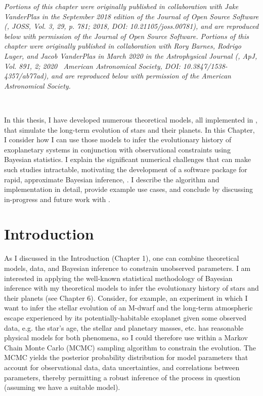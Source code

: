 \textit{Portions of this chapter were originally published in collaboration with Jake VanderPlas in the September 2018 edition of the Journal of Open Source Software (\citet{FlemingVanderPlas2018}, JOSS, Vol. 3, 29, p. 781; 2018, DOI: 10.21105/joss.00781), and are reproduced below with permission of the Journal of Open Source Software. Portions of this chapter were originally published in collaboration with Rory Barnes, Rodrigo Luger, and Jacob VanderPlas in March 2020 in the Astrophysical Journal (\citet{Fleming2020}, ApJ, Vol. 891, 2; 2020 \textcopyright \ American Astronomical Society, DOI: 10.3847/1538-4357/ab77ad), and are reproduced below with permission of the American Astronomical Society.}

\

In this thesis, I have developed numerous theoretical models, all implemented in \vplanet, that simulate the long-term evolution of stars and their planets. In this Chapter, I consider how I can use those models to infer the evolutionary history of exoplanetary systems in conjunction with observational constraints using Bayesian statistics. I explain the significant numerical challenges that can make such studies intractable, motivating the development of a software package for rapid, approximate Bayesian inference, \approxposterior \citep{FlemingVanderPlas2018}. I describe the \approxposterior algorithm and implementation in detail, provide example use cases, and conclude by discussing in-progress and future work with \approxposterior. 

\section{Introduction}

As I discussed in the Introduction (Chapter 1), one can combine theoretical models, data, and Bayesian inference to constrain unobserved parameters. I am interested in applying the well-known statistical methodology of Bayesian inference with my theoretical models to infer the evolutionary history of stars and their planets (see Chapter 6). Consider, for example, an experiment in which I want to infer the stellar evolution of an M-dwarf and the long-term atmospheric escape experienced by its potentially-habitable exoplanet given some observed data, e.g. the star's age, the stellar and planetary masses, etc. \vplanet has reasonable physical models for both phenomena, so I could therefore use \vplanet within a Markov Chain Monte Carlo (MCMC) sampling algorithm to constrain the evolution. The MCMC yields the posterior probability distribution for model parameters that account for observational data, data uncertainties, and correlations between parameters, thereby permitting a robust inference of the process in question (assuming we have a suitable model).

